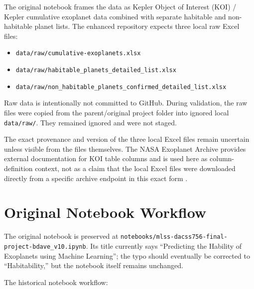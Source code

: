 \documentclass[11pt]{article}
\newcommand{\code}[1]{\texttt{#1}}
\begin{document}
The original notebook frames the data as Kepler Object of Interest (KOI) / Kepler cumulative exoplanet data combined with separate habitable and non-habitable planet lists. The enhanced repository expects three local raw Excel files:

\begin{itemize}
  \item \code{data/raw/cumulative-exoplanets.xlsx}
  \item \code{data/raw/habitable\_planets\_detailed\_list.xlsx}
  \item \code{data/raw/non\_habitable\_planets\_confirmed\_detailed\_list.xlsx}
\end{itemize}

Raw data is intentionally not committed to GitHub. During validation, the raw files were copied from the parent/original project folder into ignored local \code{data/raw/}. They remained ignored and were not staged.

The exact provenance and version of the three local Excel files remain uncertain unless visible from the files themselves. The NASA Exoplanet Archive provides external documentation for KOI table columns and is used here as column-definition context, not as a claim that the local Excel files were downloaded directly from a specific archive endpoint in this exact form \cite{nasaKoiColumns}.

\section{Original Notebook Workflow}

The original notebook is preserved at \code{notebooks/mlss-dacss756-final-project-bdave\_v10.ipynb}. Its title currently says ``Predicting the Hability of Exoplanets using Machine Learning''; the typo should eventually be corrected to ``Habitability,'' but the notebook itself remains unchanged.

The historical notebook workflow:
\end{document}
